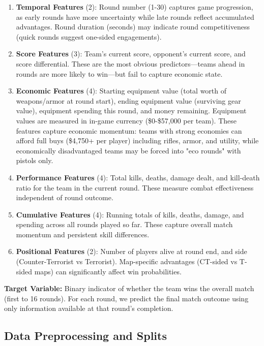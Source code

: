 \documentclass[10pt,twocolumn]{article}
\begin{document}
\begin{enumerate}
    \item \textbf{Temporal Features} (2): Round number (1-30) captures game progression, as early rounds have more uncertainty while late rounds reflect accumulated advantages. Round duration (seconds) may indicate round competitiveness (quick rounds suggest one-sided engagements).

    \item \textbf{Score Features} (3): Team's current score, opponent's current score, and score differential. These are the most obvious predictors—teams ahead in rounds are more likely to win—but fail to capture economic state.

    \item \textbf{Economic Features} (4): Starting equipment value (total worth of weapons/armor at round start), ending equipment value (surviving gear value), equipment spending this round, and money remaining. Equipment values are measured in in-game currency (\$0-\$57,000 per team). These features capture economic momentum: teams with strong economies can afford full buys (\$4,750+ per player) including rifles, armor, and utility, while economically disadvantaged teams may be forced into "eco rounds" with pistols only.

    \item \textbf{Performance Features} (4): Total kills, deaths, damage dealt, and kill-death ratio for the team in the current round. These measure combat effectiveness independent of round outcome.

    \item \textbf{Cumulative Features} (4): Running totals of kills, deaths, damage, and spending across all rounds played so far. These capture overall match momentum and persistent skill differences.

    \item \textbf{Positional Features} (2): Number of players alive at round end, and side (Counter-Terrorist vs Terrorist). Map-specific advantages (CT-sided vs T-sided maps) can significantly affect win probabilities.
\end{enumerate}

\textbf{Target Variable:} Binary indicator of whether the team wins the overall match (first to 16 rounds). For each round, we predict the final match outcome using only information available at that round's completion.

\subsection{Data Preprocessing and Splits}
\end{document}

